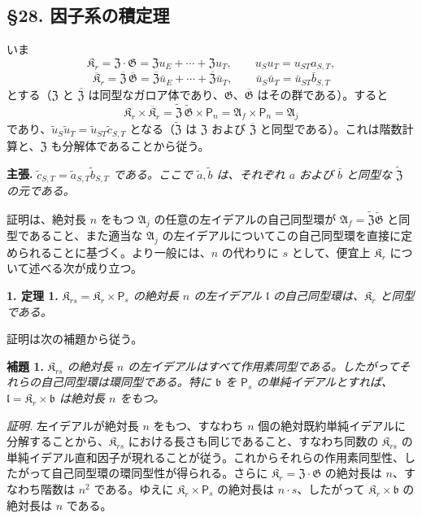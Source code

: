 \subsection*{\S 28. 因子系の積定理}\label{produktsatz-fuer-faktorensysteme}

いま
\[
\mathfrak K_r=\mathfrak Z\cdot\mathfrak G
=\mathfrak Zu_E+\cdots+\mathfrak Zu_T,
\qquad u_Su_T=u_{ST}a_{S,T},
\]
\[
\overline{\mathfrak K}_r
=\overline{\mathfrak Z}\,\overline{\mathfrak G}
=\overline{\mathfrak Z}\bar u_E+\cdots+\overline{\mathfrak Z}\bar u_T,
\qquad
\bar u_S\bar u_T=\bar u_{ST}\bar b_{S,T}
\]
とする（\(\mathfrak Z\) と \(\overline{\mathfrak Z}\) は同型なガロア体であり、\(\mathfrak G\)、\(\overline{\mathfrak G}\) はその群である）。すると
\[
\mathfrak K_r\times\overline{\mathfrak K}_r
=\widetilde{\mathfrak Z}\,\widetilde{\mathfrak G}\times\mathsf P_n
=\mathfrak A_f\times\mathsf P_n
=\mathfrak A_j
\]
であり、\(\tilde u_S\tilde u_T=\tilde u_{ST}\tilde c_{S,T}\) となる（\(\widetilde{\mathfrak Z}\) は \(\mathfrak Z\) および \(\overline{\mathfrak Z}\) と同型である）。これは階数計算と、\(\mathfrak Z\) も分解体であることから従う。

\noindent\textbf{主張.} \emph{\(\tilde c_{S,T}=\tilde a_{S,T}\tilde b_{S,T}\) である。ここで \(\tilde a,\tilde b\) は、それぞれ \(a\) および \(\bar b\) と同型な \(\widetilde{\mathfrak Z}\) の元である。}

証明は、絶対長 \(n\) をもつ \(\mathfrak A_j\) の任意の左イデアルの自己同型環が \(\mathfrak A_f=\widetilde{\mathfrak Z}\widetilde{\mathfrak G}\) と同型であること、また適当な \(\mathfrak A_j\) の左イデアルについてこの自己同型環を直接に定められることに基づく。より一般には、\(n\) の代わりに \(s\) として、便宜上 \(\mathfrak K_r\) について述べる次が成り立つ。

\noindent\textbf{1. 定理 1.} \emph{\(\mathfrak K_{rs}=\mathfrak K_r\times\mathsf P_s\) の絶対長 \(n\) の左イデアル \(\mathfrak l\) の自己同型環は、\(\mathfrak K_r\) と同型である。}

証明は次の補題から従う。

\noindent\textbf{補題 1.} \emph{\(\mathfrak K_{rs}\) の絶対長 \(n\) の左イデアルはすべて作用素同型である。したがってそれらの自己同型環は環同型である。特に \(\mathfrak b\) を \(\mathsf P_s\) の単純イデアルとすれば、\(\mathfrak l=\mathfrak K_r\times\mathfrak b\) は絶対長 \(n\) をもつ。}

\noindent\emph{証明.} 左イデアルが絶対長 \(n\) をもつ、すなわち \(n\) 個の絶対既約単純イデアルに分解することから、\(\mathfrak K_{rs}\) における長さも同じであること、すなわち同数の \(\mathfrak K_{rs}\) の単純イデアル直和因子が現れることが従う。これからそれらの作用素同型性、したがって自己同型環の環同型性が得られる。さらに \(\mathfrak K_r=\mathfrak Z\cdot\mathfrak G\) の絶対長は \(n\)、すなわち階数は \(n^2\) である。ゆえに \(\mathfrak K_r\times\mathsf P_s\) の絶対長は \(n\cdot s\)、したがって \(\mathfrak K_r\times\mathfrak b\) の絶対長は \(n\) である。

